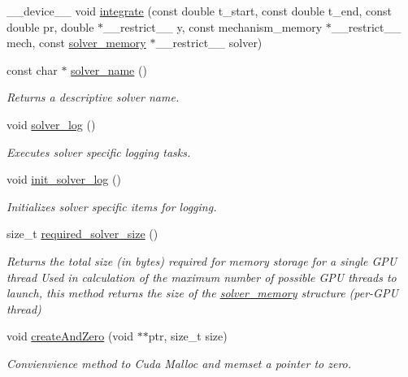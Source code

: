\begin{DoxyCompactItemize}
\item 
\+\_\+\+\_\+device\+\_\+\+\_\+ void \hyperlink{namespaceexprb43cu_ad98c42138e12fe026951999e87b1ceb4}{integrate} (const double t\+\_\+start, const double t\+\_\+end, const double pr, double $\ast$\+\_\+\+\_\+restrict\+\_\+\+\_\+ y, const mechanism\+\_\+memory $\ast$\+\_\+\+\_\+restrict\+\_\+\+\_\+ mech, const \hyperlink{structexprb43cu_1_1solver__memory}{solver\+\_\+memory} $\ast$\+\_\+\+\_\+restrict\+\_\+\+\_\+ solver)
\item 
const char $\ast$ \hyperlink{namespaceexprb43cu_adb32cc589856026fca36d47f1982ee00}{solver\+\_\+name} ()
\begin{DoxyCompactList}\small\item\em Returns a descriptive solver name. \end{DoxyCompactList}\item 
void \hyperlink{namespaceexprb43cu_a4cf705b7d338850571b92dcae3e1654c}{solver\+\_\+log} ()
\begin{DoxyCompactList}\small\item\em Executes solver specific logging tasks. \end{DoxyCompactList}\item 
void \hyperlink{namespaceexprb43cu_aa82c3608832f5b5891f2f3a992aaf8c7}{init\+\_\+solver\+\_\+log} ()
\begin{DoxyCompactList}\small\item\em Initializes solver specific items for logging. \end{DoxyCompactList}\item 
size\+\_\+t \hyperlink{namespaceexprb43cu_ad837089abb4cfc3819786aad86440da0}{required\+\_\+solver\+\_\+size} ()
\begin{DoxyCompactList}\small\item\em Returns the total size (in bytes) required for memory storage for a single G\+PU thread Used in calculation of the maximum number of possible G\+PU threads to launch, this method returns the size of the \hyperlink{structexprb43cu_1_1solver__memory}{solver\+\_\+memory} structure (per-\/\+G\+PU thread) \end{DoxyCompactList}\item 
void \hyperlink{namespaceexprb43cu_a411c61dc481c439d2a19e8f17ec5af63}{create\+And\+Zero} (void $\ast$$\ast$ptr, size\+\_\+t size)
\begin{DoxyCompactList}\small\item\em Convienvience method to Cuda Malloc and memset a pointer to zero. \end{DoxyCompactList}\item 
$$
\end{DoxyCompactItemize}

